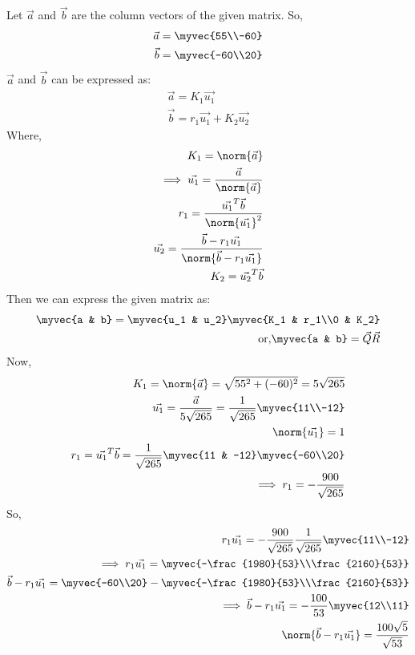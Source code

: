 
Let $\vec{a}$ and $\vec{b}$ are the column vectors of the given matrix. So,
\begin{align}
\vec{a} = \myvec{55\\-60}\\
\vec{b} = \myvec{-60\\20}
\end{align}
$\vec{a}$ and $\vec{b}$ can be expressed as:
\begin{align}
\vec{a} = K_1 \vec{u_1}\\
\vec{b} = r_1\vec{u_1} + K_2\vec{u_2}
\end{align}
Where,
\begin{align}
K_1= \norm{\vec{a}}\\
\implies \vec{u_1} = \frac{\vec{a}}{\norm{\vec{a}}}\\
r_1 = \frac{\vec{u_1}^T \vec{b}}{\norm{\vec{u_1}}^2}\\
\vec{u_2}= \frac{\vec{b}-r_1\vec{u_1}}{\norm{\vec{b}-r_1\vec{u_1}}}\\
K_2 = \vec{u_2}^T \vec{b}
\end{align}
Then we can express the given matrix as:
\begin{align}
\myvec{a & b} = \myvec{u_1 & u_2}\myvec{K_1 & r_1\\0 & K_2}\\
\text{or,} \myvec{a & b} = \vec{Q}\vec{R}
\end{align}
Now, 
\begin{align}
K_1 =\norm{\vec{a}}= \sqrt{55^2 + (-60)^2} = 5\sqrt{265}\\
\vec{u_1} = \frac{\vec{a}}{5\sqrt{265}} = \frac{1}{\sqrt{265}}\myvec{11\\-12}\\
\norm{\vec{u_1}} = 1\\
r_1= \vec{u_1}^T \vec{b} = \frac{1}{\sqrt{265}}\myvec{11 & -12}\myvec{-60\\20}\\
\implies r_1=-\frac{900}{\sqrt{265}}
\end{align}
So,
\begin{align}
r_1 \vec{u_1}= -\frac{900}{\sqrt{265}} \frac{1}{\sqrt{265}}\myvec{11\\-12}\\
\implies r_1 \vec{u_1}=\myvec{-\frac{1980}{53}\\\frac{2160}{53}}\\
\vec{b} - r_1 \vec{u_1}= \myvec{-60\\20} - \myvec{-\frac{1980}{53}\\\frac{2160}{53}}\\
\implies \vec{b} - r_1 \vec{u_1} = -\frac{100}{53}\myvec{12\\11}\\
\norm{\vec{b} - r_1 \vec{u_1}} = \frac{100\sqrt{5}}{\sqrt{53}}
\end{align}
